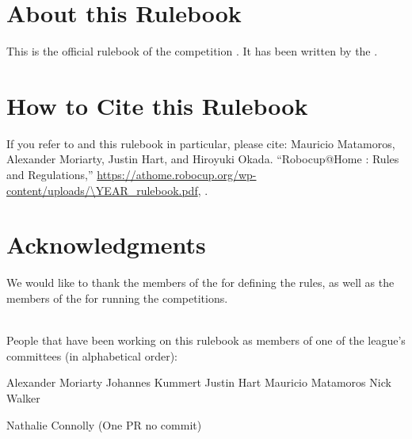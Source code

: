 


\section*{About this Rulebook}
This is the official rulebook of the \AtHome{} competition \YEAR.
It has been written by the \YEAR{} \TC{}.


\section*{How to Cite this Rulebook}
If you refer to \AtHome{} and this rulebook in particular, please cite:
Mauricio Matamoros, Alexander Moriarty, Justin Hart, and Hiroyuki Okada.
\enquote{Robocup@Home \YEAR: Rules and Regulations,}
\url{https://athome.robocup.org/wp-content/uploads/\YEAR_rulebook.pdf}, \YEAR.

\begin{center}
\begin{minipage}{0.8\textwidth}
	\scriptsize%
	
\end{minipage}
\end{center}

\section*{Acknowledgments}
\label{sec:acknowledgments}
We would like to thank the members of the \TC{} for defining the rules, as well as the members of the \OC{} for running the competitions.

~\\\noindent People that have been working on this rulebook as members of one of the league's committees (in alphabetical order):
\begin{center}
	\begin{minipage}{0.8\textwidth}
		\begin{multicols}{3}%
			\footnotesize
			\noindent%

Alexander Moriarty
Johannes Kummert
Justin Hart
Mauricio Matamoros
Nick Walker

			Nathalie Connolly (One PR no commit)

		\end{multicols}
	\end{minipage}
\end{center}

